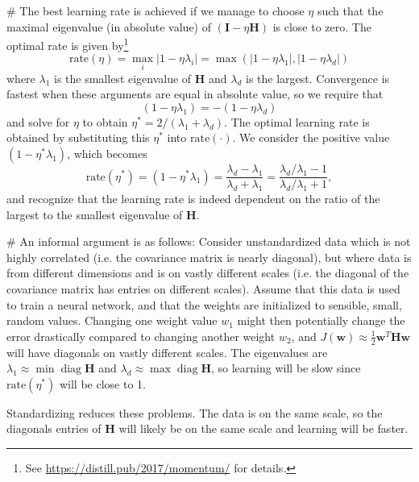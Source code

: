 \documentclass[12pt, a4paper]{article}
\newcommand{\vect}[1]{\bm{#1}}
\newcommand{\abs}[1]{\left\lvert#1\right\rvert}
\begin{document}
{\begin{easylist}[enumerate]
# The best learning rate is achieved if we manage to choose $\eta$ such that the maximal eigenvalue (in absolute value) of $\left( \vect{I} - \eta  \vect{H} \right)$ is close to zero.
The optimal rate is given by\footnote{See \url{https://distill.pub/2017/momentum/} for details.}
\begin{equation*}
	\text{rate}(\eta) = \max_i \abs{1 - \eta \lambda_i}
	= \max \left( \abs{1 - \eta \lambda_1} , \abs{1 - \eta \lambda_d}\right)
\end{equation*}
where $\lambda_1$ is the smallest eigenvalue of $\vect{H}$ and $\lambda_d$ is the largest.
Convergence is fastest when these arguments are equal in absolute value, so we require that
\begin{equation*}
	(1 - \eta \lambda_1) = - (1 - \eta \lambda_d)
\end{equation*}
and solve for $\eta$ to obtain $\eta^*= 2 / (\lambda_1 + \lambda_d)$.
The optimal learning rate is obtained by substituting this $\eta^*$ into $\text{rate}(\cdot)$.
We consider the positive value $(1 - \eta^* \lambda_1)$, which becomes
\begin{equation*}
	\text{rate}(\eta^*) = (1 - \eta^* \lambda_1) = \frac{\lambda_d - \lambda_1}{\lambda_d + \lambda_1} = \frac{ \lambda_d / \lambda_1 - 1}{\lambda_d / \lambda_1 + 1},
\end{equation*}
and recognize that the learning rate is indeed dependent on the ratio of the largest to the smallest eigenvalue of $\vect{H}$.

# An informal argument is as follows: Consider unstandardized data which is not highly correlated (i.e. the covariance matrix is nearly diagonal), but where data is from different dimensions and is on vastly different scales (i.e. the diagonal of the covariance matrix has entries on different scales).
Assume that this data is used to train a neural network, and that the weights are initialized to sensible, small, random values.
Changing one weight value $w_1$ might then potentially change the error drastically compared to changing another weight $w_2$, and $J(\vect{w}) \approx \frac{1}{2}\vect{w}^T \vect{H} \vect{w}$ will have diagonals on vastly different scales.
The eigenvalues are $\lambda_1 \approx \min \operatorname{diag} \vect{H}$ and $\lambda_d \approx \max \operatorname{diag} \vect{H}$, so learning will be slow since $\text{rate}(\eta^*)$ will be close to 1.

Standardizing reduces these problems.
The data is on the same scale, so the diagonals entries of $\vect{H}$ will likely be on the same scale and learning will be faster.


\end{easylist}}
\end{document}
